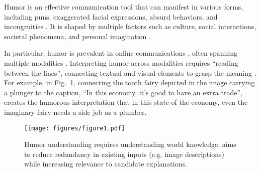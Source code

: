 
Humor is an effective communication tool \cite{stauffer-humor, wanzer-humor, vartabedian-humor, kasulis-humor} that can manifest in various forms, including puns, exaggerated facial expressions, absurd behaviors, and incongruities \cite{philosophy-humor}. It is shaped by multiple factors such as culture, social interactions, societal phenomena, and personal imagination \cite{humorous-things, Warren-humor}. %

In particular, humor is prevalent in online communications \cite{mcculloch2020because}, often spanning multiple modalities \cite[e.g., cartoons and memes;][]{shifman2013memes}. Interpreting humor across modalities requires ``reading between the lines'', connecting textual and visual elements to grasp the meaning \cite{Warren-humor}. 
For example, in Fig.~\ref{fig:fig1}, connecting the tooth fairy depicted in the image carrying a plunger to the caption, ``In this economy, it's good to have an extra trade'', creates the humorous interpretation that in this state of the economy, even the imaginary fairy needs a side job as a plumber.

\begin{figure}[t]
  \texttt{[image: figures/figure1.pdf]} \hfill
  \vspace{-20pt}
  \caption{Humor understanding requires understanding world knowledge. \method{} aims to reduce redundancy in existing inputs (e.g. image descriptions) while increasing relevance to candidate explanations.}
  \label{fig:fig1}
\end{figure}


